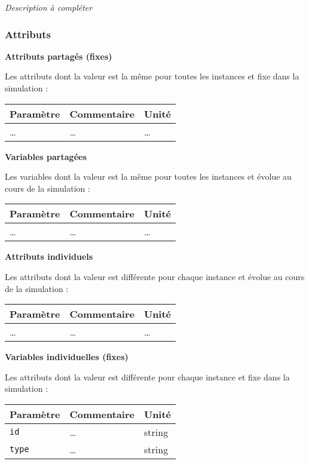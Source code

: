 \documentclass[
]{article}
\begin{document}
\emph{Description à compléter}

\subsubsection{Attributs}\label{attributs}

\textbf{Attributs partagés (fixes)}

Les attributs dont la valeur est la même pour toutes les instances et
fixe dans la simulation :

\begin{longtable}[]{@{}lll@{}}
\toprule\noalign{}
\textbf{Paramètre} & \textbf{Commentaire} & \textbf{Unité} \\
\midrule\noalign{}
\endhead
\bottomrule\noalign{}
\endlastfoot
\ldots{} & \ldots{} & \ldots{} \\
\end{longtable}

\textbf{Variables partagées}

Les variables dont la valeur est la même pour toutes les instances et
évolue au cours de la simulation :

\begin{longtable}[]{@{}lll@{}}
\toprule\noalign{}
\textbf{Paramètre} & \textbf{Commentaire} & \textbf{Unité} \\
\midrule\noalign{}
\endhead
\bottomrule\noalign{}
\endlastfoot
\ldots{} & \ldots{} & \ldots{} \\
\end{longtable}

\textbf{Attributs individuels}

Les attributs dont la valeur est différente pour chaque instance et
évolue au cours de la simulation :

\begin{longtable}[]{@{}lll@{}}
\toprule\noalign{}
\textbf{Paramètre} & \textbf{Commentaire} & \textbf{Unité} \\
\midrule\noalign{}
\endhead
\bottomrule\noalign{}
\endlastfoot
\ldots{} & \ldots{} & \ldots{} \\
\end{longtable}

\textbf{Variables individuelles (fixes)}

Les attributs dont la valeur est différente pour chaque instance et fixe
dans la simulation :

\begin{longtable}[]{@{}lll@{}}
\toprule\noalign{}
\textbf{Paramètre} & \textbf{Commentaire} & \textbf{Unité} \\
\midrule\noalign{}
\endhead
\bottomrule\noalign{}
\endlastfoot
\texttt{id} & \ldots{} & string \\
\texttt{type} & \ldots{} & string \\
\end{longtable}
\end{document}
